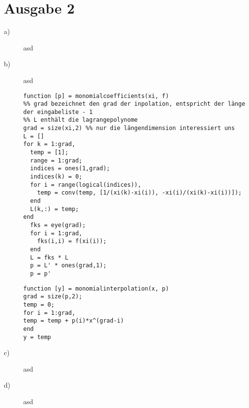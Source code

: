 \documentclass[11pt,a4paper,ngerman]{article}
\begin{document}

\section*{Ausgabe 2}

\begin{description}
\item[a)] asd
\item[b)] asd
\begin{lstlisting}
function [p] = monomialcoefficients(xi, f)
%% grad bezeichnet den grad der inpolation, entspricht der länge der eingabeliste - 1
%% L enthält die lagrangepolynome
grad = size(xi,2) %% nur die längendimension interessiert uns
L = []
for k = 1:grad,
  temp = [1];
  range = 1:grad;
  indices = ones(1,grad);
  indices(k) = 0;
  for i = range(logical(indices)),
    temp = conv(temp, [1/(xi(k)-xi(i)), -xi(i)/(xi(k)-xi(i))]);
  end
  L(k,:) = temp;
end
  fks = eye(grad);
  for i = 1:grad,
    fks(i,i) = f(xi(i));
  end
  L = fks * L
  p = L' * ones(grad,1); 
  p = p'
\end{lstlisting}

\begin{lstlisting}
function [y] = monomialinterpolation(x, p)
grad = size(p,2);
temp = 0;
for i = 1:grad,
temp = temp + p(i)*x^(grad-i)
end
y = temp
\end{lstlisting}
\item[c)] asd
\item[d)] asd
\end{description}

\label{LastPage}
\end{document}

